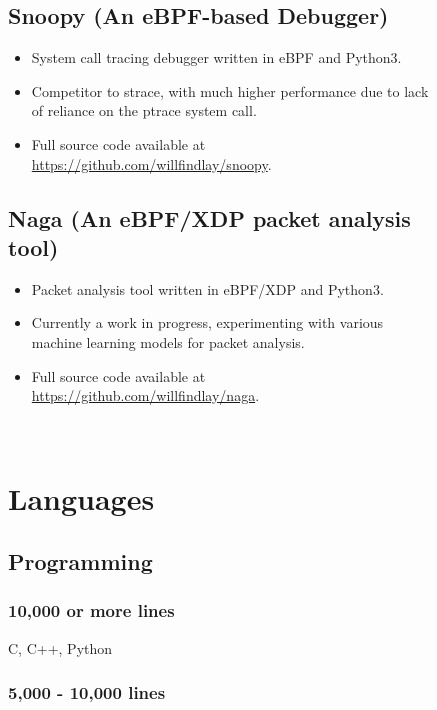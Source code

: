 \documentclass[]{article}
\theoremstyle{plain}
\theoremstyle{remark}
\theoremstyle{definition}
\begin{document}
\begin{figure}
\begin{minipage}[t]{0.65\textwidth}
\subsection{Snoopy (An eBPF-based Debugger)}
\begin{itemize}[itemsep=0em]
\item System call tracing debugger written in eBPF and Python3.
\item Competitor to strace, with much higher performance due to lack of reliance on the ptrace system call.
\item Full source code available at \url{https://github.com/willfindlay/snoopy}.
\end{itemize}

\subsection{Naga (An eBPF/XDP packet analysis tool)}
\begin{itemize}[itemsep=0em]
\item Packet analysis tool written in eBPF/XDP and Python3.
\item Currently a work in progress, experimenting with various machine learning models for packet analysis.
\item Full source code available at \url{https://github.com/willfindlay/naga}.
\end{itemize}

\end{minipage}
\hfill
\begin{minipage}[t]{0.32\textwidth}
\color{gray}
\ %
\vspace{-1.5em}

\section{Languages}

\subsection{Programming}

\subsubsection{10,000 or more lines}

C, C++, Python

\subsubsection{5,000 - 10,000 lines}


\end{minipage}
\end{figure}
\end{document}
